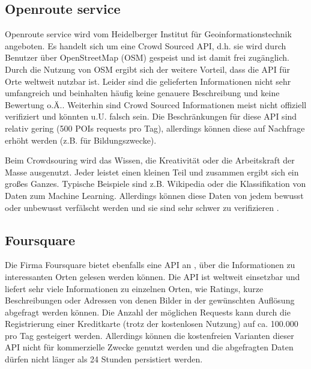 \subsection{Openroute service}
Openroute service \cite{TheHeidelbergInstituteforGeoinformationTechnology.} wird vom Heidelberger Institut für Geoinformationstechnik angeboten. Es handelt sich um eine Crowd Sourced API, d.h. sie wird durch Benutzer über OpenStreetMap (OSM) \cite{OpenStreetMap.} gespeist und ist damit frei zugänglich. Durch die Nutzung von OSM ergibt sich der weitere Vorteil, dass die API für Orte weltweit nutzbar ist. Leider sind die gelieferten Informationen nicht sehr umfangreich und beinhalten häufig keine genauere Beschreibung und keine Bewertung o.Ä.. Weiterhin sind Crowd Sourced Informationen meist nicht offiziell verifiziert und könnten u.U. falsch sein. Die Beschränkungen für diese API sind relativ gering (500 POIs requests pro Tag), allerdings können diese auf Nachfrage erhöht werden (z.B. für Bildungszwecke).

\begin{defStrich}[Crowdsourcing]
	Beim Crowdsouring wird das Wissen, die Kreativität oder die Arbeitskraft der Masse ausgenutzt. Jeder leistet einen kleinen Teil und zusammen ergibt sich ein großes Ganzes. Typische Beispiele sind z.B. Wikipedia oder die Klassifikation von Daten zum Machine Learning. Allerdings können diese Daten von jedem bewusst oder unbewusst verfälscht werden und sie sind sehr schwer zu verifizieren \cite{Winkler.2009}. 
\end{defStrich}

\subsection{Foursquare}
Die Firma Foursquare bietet ebenfalls eine API an \cite{Foursquare.}, über die Informationen zu interessanten Orten gelesen werden können. Die API ist weltweit einsetzbar und liefert sehr viele Informationen zu einzelnen Orten, wie Ratings, kurze Beschreibungen oder Adressen von denen Bilder in der gewünschten Auflösung abgefragt werden können. Die Anzahl der möglichen Requests kann durch die Registrierung einer Kreditkarte (trotz der kostenlosen Nutzung) auf ca. 100.000 pro Tag gesteigert werden. Allerdings können die kostenfreien Varianten dieser API nicht für kommerzielle Zwecke genutzt werden und die abgefragten Daten dürfen nicht länger als 24 Stunden persistiert werden. 


